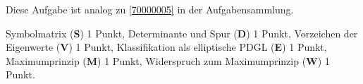 \begin{diskussion}
Diese Aufgabe ist analog zu \ref{70000005} in der Aufgabensammlung.
\end{diskussion}

\begin{bewertung}
Symbolmatrix ({\bf S}) 1 Punkt,
Determinante und Spur ({\bf D}) 1 Punkt,
Vorzeichen der Eigenwerte ({\bf V}) 1 Punkt,
Klassifikation als elliptische PDGL ({\bf E}) 1 Punkt,
Maximumprinzip ({\bf M}) 1 Punkt,
Widerspruch zum Maximumprinzip ({\bf W}) 1 Punkt.
\end{bewertung}
